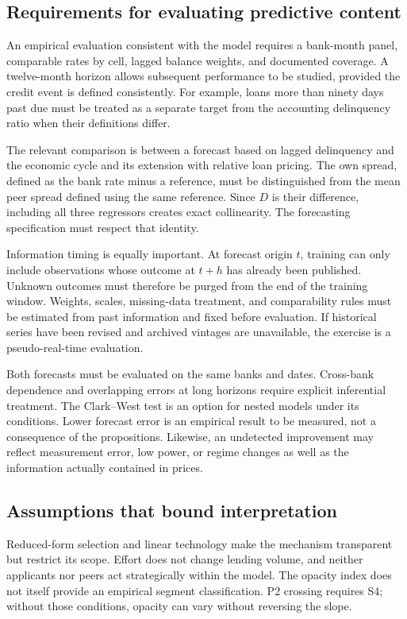 \documentclass[11pt]{article}
\theoremstyle{definition}\newtheorem{assumption}{Assumption}
\begin{document}
\subsection{Requirements for evaluating predictive content}
An empirical evaluation consistent with the model requires a bank-month
panel, comparable rates by cell, lagged balance weights, and documented
coverage. A twelve-month horizon allows subsequent performance to be studied,
provided the credit event is defined consistently. For example, loans more
than ninety days past due must be treated as a separate target from the
accounting delinquency ratio when their definitions differ.

The relevant comparison is between a forecast based on lagged delinquency
and the economic cycle and its extension with relative loan pricing. The
own spread, defined as the bank rate minus a reference, must be distinguished
from the mean peer spread defined using the same reference. Since $D$ is
their difference, including all three regressors creates exact collinearity.
The forecasting specification must respect that identity.

Information timing is equally important. At forecast origin $t$, training
can only include observations whose outcome at $t+h$ has already been
published. Unknown outcomes must therefore be purged from the end of the
training window. Weights, scales, missing-data treatment, and comparability
rules must be estimated from past information and fixed before evaluation.
If historical series have been revised and archived vintages are unavailable,
the exercise is a pseudo-real-time evaluation.

Both forecasts must be evaluated on the same banks and dates. Cross-bank
dependence and overlapping errors at long horizons require explicit
inferential treatment. The Clark--West test is an option for nested models
under its conditions. Lower forecast error is an empirical result to be
measured, not a consequence of the propositions. Likewise, an undetected
improvement may reflect measurement error, low power, or regime changes as
well as the information actually contained in prices.

\subsection{Assumptions that bound interpretation}
Reduced-form selection and linear technology make the mechanism transparent
but restrict its scope. Effort does not change lending volume, and neither
applicants nor peers act strategically within the model. The opacity index
does not itself provide an empirical segment classification. P2 crossing
requires S4; without those conditions, opacity can vary without reversing
the slope.
\end{document}
